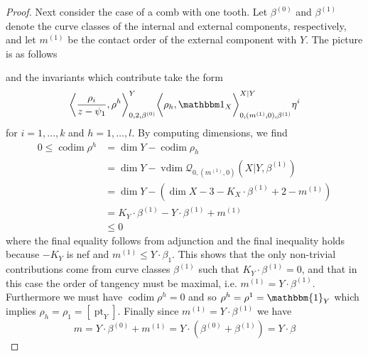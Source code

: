 \documentclass[10pt]{amsart}
\newcommand{\Q}[4]{\mathcal{Q}_{#1,#2}(#3,#4)}
\newcommand{\pt}{\operatorname{pt}}
\newcommand{\codim}{\operatorname{codim}}
\newcommand{\vdim}{\operatorname{vdim}}
\theoremstyle{definition}
\theoremstyle{definition}
\begin{document}
\begin{proof}
Next consider the case of a comb with one tooth. Let $\beta^{(0)}$ and $\beta^{(1)}$ denote the curve classes of the internal and external components, respectively, and let $m^{(1)}$ be the contact order of the external component with $Y$. The picture is as follows
\begin{center}
\end{center}
and the invariants which contribute take the form
\begin{equation*} \bigg\langle \dfrac{\rho_i}{z-\psi_1},\rho^h\bigg\rangle_{0,2,\beta^{(0)}}^Y \bigg\langle \rho_h, \mathbbm 1_{X}\bigg\rangle_{0,(m^{(1)},0),\beta^{(1)}}^{X|Y}\eta^i \end{equation*}
for $i = 1, \ldots, k$ and $h = 1, \ldots, l$. By computing dimensions, we find
\begin{align*}
0\leq \codim \rho^h &= \dim Y-\codim \rho_h \\
&= \dim Y-\vdim \Q{0}{(m^{(1)},0)}{X|Y}{\beta^{(1)}} \\
&= \dim Y-(\dim X-3-K_{X}\cdot \beta^{(1)}+2-m^{(1)})\\
&= K_Y \cdot \beta^{(1)} - Y \cdot \beta^{(1)}+m^{(1)} \\
&\leq 0
\end{align*}
where the final equality follows from adjunction and the final inequality holds because $-K_Y$ is nef and $m^{(1)}\leq Y \cdot \beta_1$. This shows that the only non-trivial contributions come from curve classes $\beta^{(1)}$ such that $K_Y \cdot \beta^{(1)}=0$, and that in this case the order of tangency must be maximal, i.e. $m^{(1)}=Y \cdot \beta^{(1)}$. Furthermore we must have $\codim \rho^h = 0$ and so $\rho^h = \rho^1 = \mathbbm{1}_Y$ which implies $\rho_h = \rho_1 = [\pt_Y]$. Finally since $m^{(1)}=Y \cdot \beta^{(1)}$ we have
\begin{equation*} m = Y \cdot \beta^{(0)}+m^{(1)}=Y \cdot (\beta^{(0)} + \beta^{(1)}) = Y \cdot \beta \end{equation*}

\end{proof}
\end{document}
